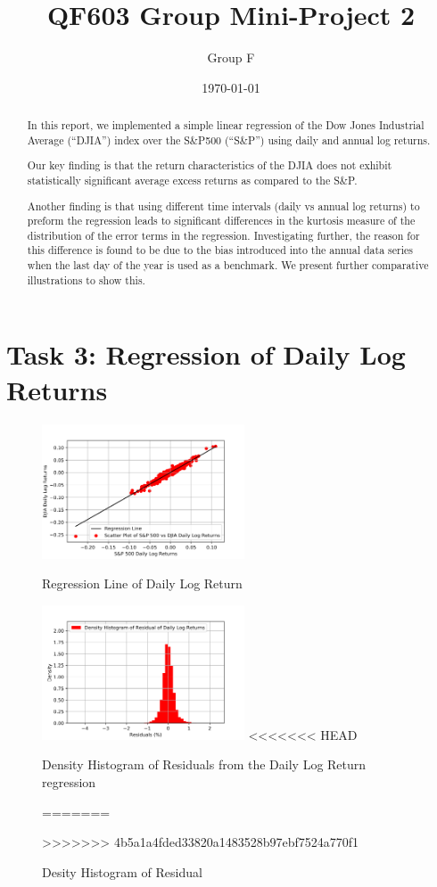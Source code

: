 \documentclass[a4paper]{article}
\title{QF603 Group Mini-Project 2}
\author{Group F}
\date{\today}
\begin{document}
	\maketitle
	
	\begin{abstract}
		In this report, we implemented a simple linear regression of the Dow Jones Industrial Average (“DJIA”) index over the S\&P500 (“S\&P”) using daily and annual log returns.
		 
		Our key finding is that the return characteristics of the DJIA does not exhibit statistically significant average excess returns as compared to the S\&P.
		 
		Another finding is that using different time intervals (daily vs annual log returns) to preform the regression leads to significant differences in the kurtosis measure of the distribution of the error terms in the regression. Investigating further, the reason for this difference is found to be due to the bias introduced into the annual data series when the last day of the year is used as a benchmark. We present further comparative illustrations to show this. 
		 	
	\end{abstract} 
	
	\newpage
	\setcounter{secnumdepth}{1}
	\section*{Task 3: Regression of Daily Log Returns}
	\label{sec:introduction}
	
	\begin{figure}[htbp]
		\centering
		\begin{minipage}[t]{0.48\textwidth}
			\centering
			\includegraphics[width=6cm]{Daily_Scatter.png}
			\caption{Regression Line of Daily Log Return}
		\end{minipage}
		\begin{minipage}[t]{0.48\textwidth}
			\centering
			\includegraphics[width=6cm]{Daily_Hist.png}
<<<<<<< HEAD
			\caption{Density Histogram of Residuals from the Daily Log Return regression}
=======
			\caption{Desity Histogram of Residual}
>>>>>>> 4b5a1a4fded33820a1483528b97ebf7524a770f1
		\end{minipage}
	\end{figure}
	
\end{document}
